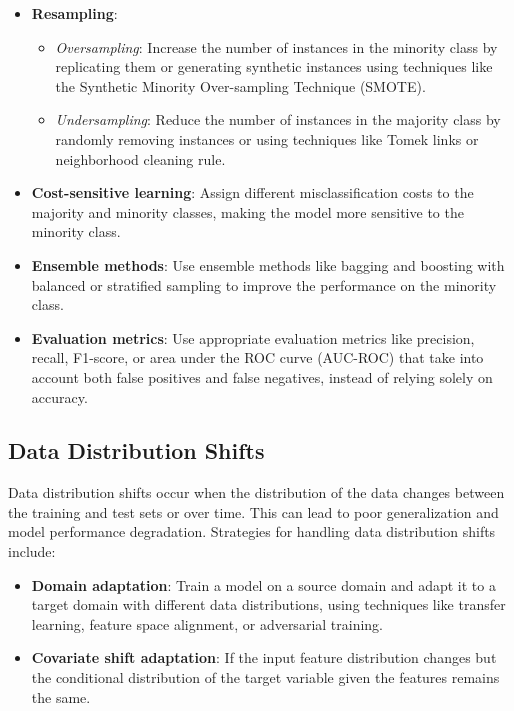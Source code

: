 \documentclass[12pt]{article}
\begin{document}
\begin{itemize}
\item \textbf{Resampling}:
\begin{itemize}
\item \textit{Oversampling}: Increase the number of instances in the minority class by replicating them or generating synthetic instances using techniques like the Synthetic Minority Over-sampling Technique (SMOTE).
\item \textit{Undersampling}: Reduce the number of instances in the majority class by randomly removing instances or using techniques like Tomek links or neighborhood cleaning rule.
\end{itemize}
\item \textbf{Cost-sensitive learning}: Assign different misclassification costs to the majority and minority classes, making the model more sensitive to the minority class.
\item \textbf{Ensemble methods}: Use ensemble methods like bagging and boosting with balanced or stratified sampling to improve the performance on the minority class.
\item \textbf{Evaluation metrics}: Use appropriate evaluation metrics like precision, recall, F1-score, or area under the ROC curve (AUC-ROC) that take into account both false positives and false negatives, instead of relying solely on accuracy.
\end{itemize}

\subsection{Data Distribution Shifts}

Data distribution shifts occur when the distribution of the data changes between the training and test sets or over time. This can lead to poor generalization and model performance degradation. Strategies for handling data distribution shifts include:

\begin{itemize}
\item \textbf{Domain adaptation}: Train a model on a source domain and adapt it to a target domain with different data distributions, using techniques like transfer learning, feature space alignment, or adversarial training.
\item \textbf{Covariate shift adaptation}: If the input feature distribution changes but the conditional distribution of the target variable given the features remains the same.
\end{itemize}
\end{document}

